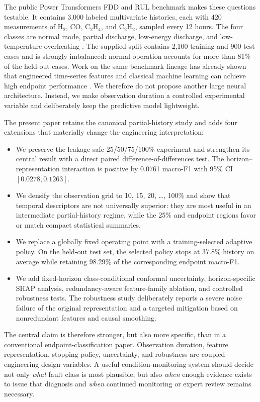 \documentclass[conference]{IEEEtran}
\begin{document}
The public Power Transformers FDD and RUL benchmark makes these questions testable. It contains 3,000 labeled multivariate histories, each with 420 measurements of H$_2$, CO, C$_2$H$_4$, and C$_2$H$_2$, sampled every 12 hours. The four classes are normal mode, partial discharge, low-energy discharge, and low-temperature overheating \cite{katserDataset}. The supplied split contains 2,100 training and 900 test cases and is strongly imbalanced: normal operation accounts for more than 81\% of the held-out cases. Work on the same benchmark lineage has already shown that engineered time-series features and classical machine learning can achieve high endpoint performance \cite{katser2022}. We therefore do not propose another large neural architecture. Instead, we make observation duration a controlled experimental variable and deliberately keep the predictive model lightweight.

The present paper retains the canonical partial-history study and adds four extensions that materially change the engineering interpretation:
\begin{itemize}
    \item We preserve the leakage-safe 25/50/75/100\% experiment and strengthen its central result with a direct paired difference-of-differences test. The horizon--representation interaction is positive by 0.0761 macro-F1 with 95\% CI $[0.0278,0.1263]$.
    \item We densify the observation grid to 10, 15, 20, \ldots, 100\% and show that temporal descriptors are not universally superior: they are most useful in an intermediate partial-history regime, while the 25\% and endpoint regions favor or match compact statistical summaries.
    \item We replace a globally fixed operating point with a training-selected adaptive policy. On the held-out test set, the selected policy stops at 37.8\% history on average while retaining 98.29\% of the corresponding endpoint macro-F1.
    \item We add fixed-horizon class-conditional conformal uncertainty, horizon-specific SHAP analysis, redundancy-aware feature-family ablation, and controlled robustness tests. The robustness study deliberately reports a severe noise failure of the original representation and a targeted mitigation based on nonredundant features and causal smoothing.
\end{itemize}

The central claim is therefore stronger, but also more specific, than in a conventional endpoint-classification paper. Observation duration, feature representation, stopping policy, uncertainty, and robustness are coupled engineering design variables. A useful condition-monitoring system should decide not only \emph{what} fault class is most plausible, but also \emph{when} enough evidence exists to issue that diagnosis and \emph{when} continued monitoring or expert review remains necessary.
\end{document}
